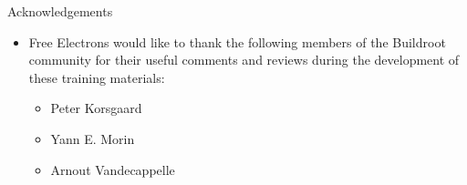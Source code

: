 \begin{frame}{Acknowledgements}

  \begin{itemize}

  \item Free Electrons would like to thank the following members of
    the Buildroot community for their useful comments and reviews
    during the development of these training materials:
    \begin{itemize}
    \item Peter Korsgaard
    \item Yann E. Morin
    \item Arnout Vandecappelle
    \end{itemize}
  \end{itemize}

\end{frame}